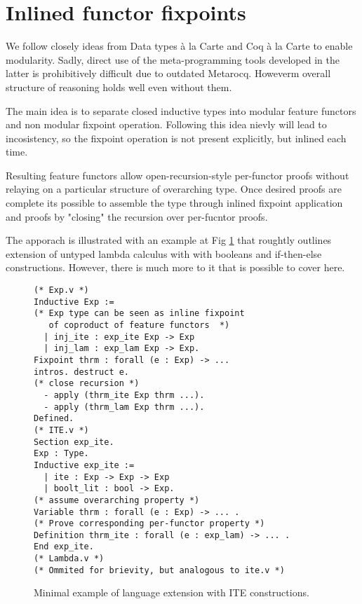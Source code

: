 \documentclass[sigplan,nonacm]{acmart}
\begin{document}

\section{Inlined functor fixpoints }

We follow closely ideas from Data types à la Carte\cite{swierstra2008data} and  Coq à la Carte\cite{forster2020coq} to enable modularity. 
Sadly, direct use of the meta-programming tools developed in the latter is prohibitively difficult due to outdated Metarocq\cite{sozeau2020metacoq}. 
Howeverm overall structure of reasoning holds well even without them. 

The main idea is to separate closed inductive types into modular feature functors and non modular fixpoint operation. 
Following this idea nievly will lead to incosistency, so the fixpoint operation is not present explicitly, but inlined each time.

Resulting feature functors allow open-recursion-style per-functor proofs without relaying on a particular structure of overarching type.
Once desired proofs are complete its possible to assemble the type through inlined fixpoint application and proofs by "closing" the recursion over per-fucntor proofs.

The apporach is illustrated with an example at Fig \ref{fig:alacart_example} that roughtly outlines extension of untyped lambda calculus with with booleans and if-then-else constructions. 
However, there is much more to it that is possible to cover here.

\begin{figure}
\begin{lstlisting}[language=Coq]
(* Exp.v *)
Inductive Exp := 
(* Exp type can be seen as inline fixpoint 
   of coproduct of feature functors  *)
  | inj_ite : exp_ite Exp -> Exp
  | inj_lam : exp_lam Exp -> Exp.
Fixpoint thrm : forall (e : Exp) -> ...
intros. destruct e.
(* close recursion *)
  - apply (thrm_ite Exp thrm ...).
  - apply (thrm_lam Exp thrm ...).
Defined.
(* ITE.v *)
Section exp_ite.
Exp : Type.
Inductive exp_ite := 
  | ite : Exp -> Exp -> Exp
  | boolt_lit : bool -> Exp.
(* assume overarching property *)
Variable thrm : forall (e : Exp) -> ... .
(* Prove corresponding per-functor property *)
Definition thrm_ite : forall (e : exp_lam) -> ... .
End exp_ite.
(* Lambda.v *)
(* Ommited for brievity, but analogous to ite.v *)
\end{lstlisting}
  \caption{Minimal example of language extension with ITE constructions.}
  \label{fig:alacart_example}
\end{figure}
\end{document}
